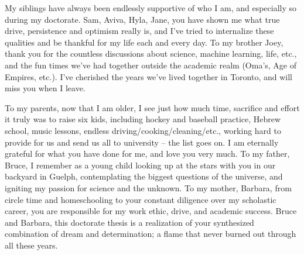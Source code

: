\documentclass[letterpaper]{ut-thesis} %
\begin{document}
\begin{preliminary}
\begin{acknowledgements}
My siblings have always been endlessly supportive of who I am, and especially so during my doctorate.
Sam, Aviva, Hyla, Jane, you have shown me what true drive, persistence and optimism really is, and I've tried to internalize these qualities and be thankful for my life each and every day. 
To my brother Joey, thank you for the countless discussions about science, machine learning, life, etc., and the fun times we've had together outside the academic realm (Oma's, Age of Empires, etc.). 
I've cherished the years we've lived together in Toronto, and will miss you when I leave. 

To my parents, now that I am older, I see just how much time, sacrifice and effort it truly was to raise six kids, including hockey and baseball practice, Hebrew school, music lessons, endless driving/cooking/cleaning/etc., working hard to provide for us and send us all to university -- the list goes on. 
I am eternally grateful for what you have done for me, and love you very much. 
To my father, Bruce, I remember as a young child looking up at the stars with you in our backyard in Guelph, contemplating the biggest questions of the universe, and igniting my passion for science and the unknown.
To my mother, Barbara, from circle time and homeschooling to your constant diligence over my scholastic career, you are responsible for my work ethic, drive, and academic success.
Bruce and Barbara, this doctorate thesis is a realization of your synthesized combination of dream and determination; a flame that never burned out through all these years. 

\end{acknowledgements}

\tableofcontents

\listoftables

\listoffigures

\end{preliminary}

\end{document}
